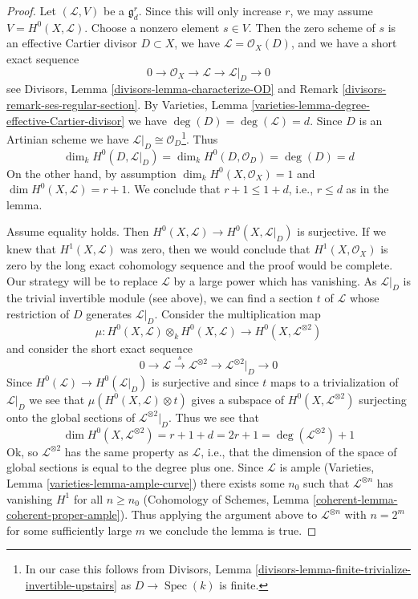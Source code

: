 \documentclass[10pt,a4paper]{amsart}
\theoremstyle{plain}
\theoremstyle{definition}
\theoremstyle{remark}
\numberwithin{equation}{subsection}
\def\Spec{\mathop{\mathrm{Spec}}}
\begin{document}
\begin{proof}
Let $(\mathcal{L}, V)$ be a $\mathfrak g^r_d$. Since this will only
increase $r$, we may assume $V = H^0(X, \mathcal{L})$. Choose a
nonzero element $s \in V$.  Then the zero scheme of $s$ is an effective Cartier
divisor $D \subset X$, we have $\mathcal{L} = \mathcal{O}_X(D)$, and
we have a short exact sequence
$$
0 \to \mathcal{O}_X \to \mathcal{L} \to \mathcal{L}|_D \to 0
$$
see Divisors, Lemma \ref{divisors-lemma-characterize-OD} and
Remark \ref{divisors-remark-ses-regular-section}.
By Varieties, Lemma \ref{varieties-lemma-degree-effective-Cartier-divisor}
we have $\deg(D) = \deg(\mathcal{L}) = d$.
Since $D$ is an Artinian scheme we have
$\mathcal{L}|_D \cong \mathcal{O}_D$\footnote{In our case this
follows from Divisors, Lemma
\ref{divisors-lemma-finite-trivialize-invertible-upstairs}
as $D \to \Spec(k)$ is finite.}.
Thus
$$
\dim_k H^0(D, \mathcal{L}|_D) = \dim_k H^0(D, \mathcal{O}_D) = \deg(D) = d
$$
On the other hand, by assumption
$\dim_k H^0(X, \mathcal{O}_X) = 1$ and $\dim H^0(X, \mathcal{L}) = r + 1$.
We conclude that $r + 1 \leq 1 + d$, i.e., $r \leq d$ as in the lemma.

\medskip\noindent
Assume equality holds. Then
$H^0(X, \mathcal{L}) \to H^0(X, \mathcal{L}|_D)$ is surjective.
If we knew that $H^1(X, \mathcal{L})$ was zero, then we would
conclude that $H^1(X, \mathcal{O}_X)$ is zero by the long exact
cohomology sequence and the proof would
be complete. Our strategy will be to replace $\mathcal{L}$ by a
large power which has vanishing. As $\mathcal{L}|_D$ is the
trivial invertible module (see above), we can
find a section $t$ of $\mathcal{L}$ whose restriction
of $D$ generates $\mathcal{L}|_D$.
Consider the multiplication map
$$
\mu :
H^0(X, \mathcal{L}) \otimes_k H^0(X, \mathcal{L})
\longrightarrow
H^0(X, \mathcal{L}^{\otimes 2})
$$
and consider the short exact sequence
$$
0 \to \mathcal{L} \xrightarrow{s}
\mathcal{L}^{\otimes 2} \to \mathcal{L}^{\otimes 2}|_D \to 0
$$
Since $H^0(\mathcal{L}) \to H^0(\mathcal{L}|_D)$ is surjective and since
$t$ maps to a trivialization of $\mathcal{L}|_D$ we see that
$\mu(H^0(X, \mathcal{L}) \otimes t)$ gives a subspace of
$H^0(X, \mathcal{L}^{\otimes 2})$ surjecting onto the global sections of
$\mathcal{L}^{\otimes 2}|_D$. Thus we see that
$$
\dim H^0(X, \mathcal{L}^{\otimes 2}) = r + 1 + d = 2r + 1 =
\deg(\mathcal{L}^{\otimes 2}) + 1
$$
Ok, so $\mathcal{L}^{\otimes 2}$ has the same property as $\mathcal{L}$, i.e.,
that the dimension of the space of global sections is equal to the
degree plus one. Since $\mathcal{L}$ is ample
(Varieties, Lemma \ref{varieties-lemma-ample-curve})
there exists some $n_0$ such that $\mathcal{L}^{\otimes n}$
has vanishing $H^1$ for all $n \geq n_0$
(Cohomology of Schemes, Lemma \ref{coherent-lemma-coherent-proper-ample}).
Thus applying the argument above to $\mathcal{L}^{\otimes n}$
with $n = 2^m$ for some sufficiently large $m$ we conclude the
lemma is true.
\end{proof}
\end{document}
